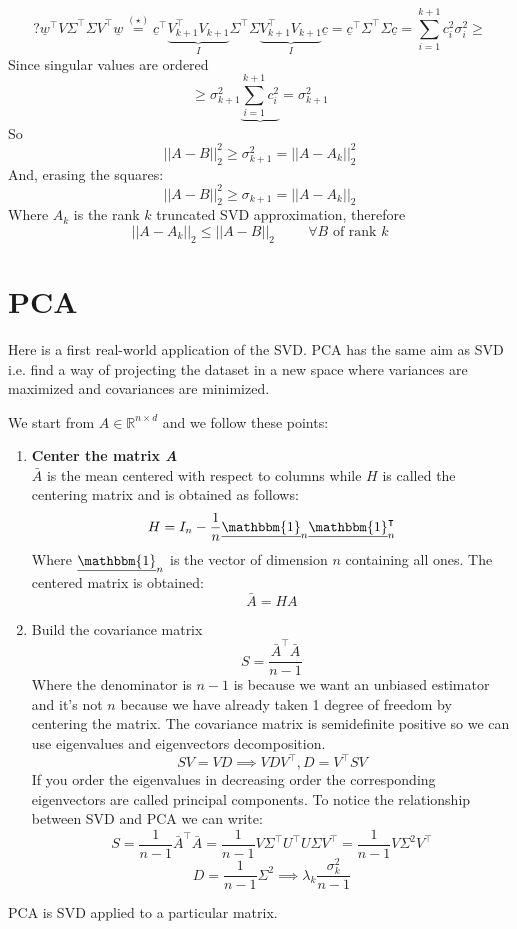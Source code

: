 \[
    ? \underline{w}^\intercal V\Sigma^\intercal \Sigma V^\intercal \underline{w} \overset{(\star)}{=} \underline{c}^\intercal \underbrace{V_{k+1}^\intercal V_{k+1}}_{I} \Sigma^\intercal \Sigma  \underbrace{V_{k+1}^\intercal V_{k+1}}_{I} \underline{c} = \underline{c}^\intercal \Sigma^\intercal \Sigma \underline{c} = \sum_{i=1}^{k+1} c_i^2 \sigma_i^2 \geq    
\] 
Since singular values are ordered
\[
    \geq \sigma_{k+1}^2 \underbrace{\sum_{i=1}^{k+1} c_i^2} = \sigma_{k+1}^2    
\]
So
\[
    ||A-B||_2^2 \geq \sigma_{k+1}^2 = ||A - A_k||_2^2    
\]
And, erasing the squares:
\[
    ||A - B||_2^2 \geq \sigma_{k+1} = ||A - A_k||_2        
\]
Where $A_k$ is the rank $k$ truncated SVD approximation, therefore
\[
    ||A - A_k||_2 \leq ||A - B||_2 \hspace{1cm} \forall B \text{ of rank } k
\]


\section{PCA}
Here is a first real-world application of the SVD. PCA has the same aim as SVD i.e. find a way of projecting the dataset in a new space where variances are maximized and covariances are minimized. 

We start from $A \in \mathbb{R}^{n \times d}$ and we follow these points:
\begin{enumerate}[i]
    \item \textbf{Center the matrix \emph{A}}\\
    $\bar{A}$ is the mean centered with respect to columns while $H$ is called the centering matrix and is obtained as follows:
    \[
        H = I_n - \dfrac{1}{n} \underline{\mathbbm{1}}_n \underline{\mathbbm{1}}_n^\intercal
    \]
    Where $\underline{\mathbbm{1}}_n$ is the vector of dimension $n$ containing all ones. The centered matrix is obtained:
    \[
        \bar{A} = HA    
    \]
    \item Build the covariance matrix
    \[
        S = \dfrac{\bar{A}^\intercal \bar{A}}{n - 1}     
    \]
    Where the denominator is $n-1$ is because we want an unbiased estimator and it's not $n$ because we have already taken 1 degree of freedom by centering the matrix. The covariance matrix is semidefinite positive so we can use eigenvalues and eigenvectors decomposition.
    \[
        SV = VD \implies VDV^\intercal, D = V^\intercal SV    
    \]
    If you order the eigenvalues in decreasing order the corresponding eigenvectors are called principal components. To notice the relationship between SVD and PCA we can write:
    \[
        S = \dfrac{1}{n-1}\bar{A}^\intercal \bar{A} = \dfrac{1}{n-1} V\Sigma^\intercal U^\intercal U \Sigma V^\intercal = \dfrac{1}{n-1} V \Sigma^2 V^\intercal    
    \]
    \[
        D = \dfrac{1}{n-1}\Sigma^2 \implies \lambda_k \dfrac{\sigma_k^2}{n-1}    
    \]
\end{enumerate}
PCA is SVD applied to a particular matrix.


